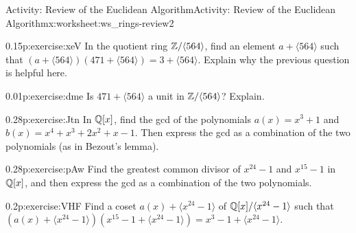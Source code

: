 \documentclass[11pt]{book}
\begin{document}
\begin{worksheet-subsection}{Activity: Review of the Euclidean Algorithm}{}{Activity: Review of the Euclidean Algorithm}{}{}{x:worksheet:ws_rings-review2}
\begin{divisionexercise}{2}{}{0.15}{p:exercise:xeV}
In the quotient ring \(\mathbb{Z}/\langle 564 \rangle\), find an element \(a + \langle 564\rangle\) such that \((a+\langle 564\rangle)(471 + \langle 564\rangle) = 3 + \langle 564 \rangle\).  Explain why the previous question is helpful here.%
\end{divisionexercise}%
\begin{divisionexercise}{3}{}{0.01}{p:exercise:dme}%
Is \(471 + \langle 564\rangle\) a unit in \(\mathbb{Z}/\langle 564\rangle\)?  Explain.%
\end{divisionexercise}%
\clearpage
\begin{divisionexercise}{4}{}{0.28}{p:exercise:Jtn}%
In \(\mathbb{Q}[x]\), find the gcd of the polynomials \(a(x) = x^3 + 1\) and \(b(x) = x^4 + x^3 + 2x^2 + x - 1\).  Then express the gcd as a combination of the two polynomials (as in Bezout's lemma).%
\end{divisionexercise}%
\begin{divisionexercise}{5}{}{0.28}{p:exercise:pAw}%
Find the greatest common divisor of \(x^{24}-1\) and \(x^{15}-1\) in \(\mathbb{Q}[x]\), and then express the gcd as a combination of the two polynomials.%
\end{divisionexercise}%
\begin{divisionexercise}{6}{}{0.2}{p:exercise:VHF}%
Find a coset \(a(x) + \langle x^{24}-1\rangle\) of \(\mathbb{Q}[x]/\langle x^{24}-1\rangle\) such that \((a(x) + \langle x^{24}-1\rangle)(x^{15}-1 + \langle x^{24}-1\rangle) = x^3-1 + \langle x^{24}-1\rangle\).%
\end{divisionexercise}%
\end{worksheet-subsection}
\restoregeometry
\end{document}
